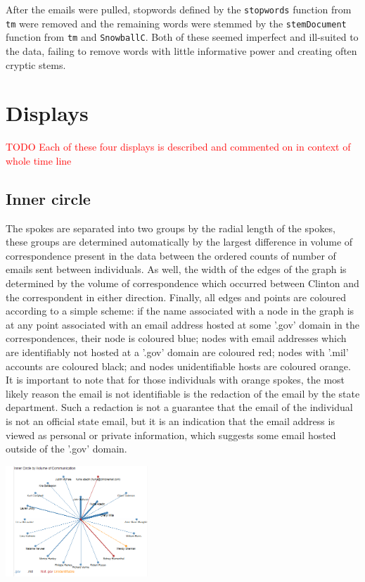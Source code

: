 \documentclass[journal]{vgtc}                %
\newcommand*{\TODO}[1]{\textcolor{red}{TODO #1}}
\begin{document}
After the emails were pulled, stopwords defined by the \texttt{stopwords} function from \texttt{tm} were removed and the remaining words were stemmed by the \texttt{stemDocument} function from \texttt{tm} and \texttt{SnowballC}. Both of these seemed imperfect and ill-suited to the data, failing to remove words with little informative power and creating often cryptic stems.

\section{Displays}
\TODO{Each of these four displays is described and commented on in context of whole time line}
\subsection{Inner circle} 
The spokes are separated into two groups by the radial length of the spokes, these groups are determined automatically by the largest difference in volume of correspondence present in the data between the ordered counts of number of emails sent between individuals. As well, the width of the edges of the graph is determined by the volume of correspondence which occurred between Clinton and the correspondent in either direction. Finally, all edges and points are coloured according to a simple scheme: if the name associated with a node in the graph is at any point associated with an email address hosted at some '.gov' domain in the correspondences, their node is coloured blue; nodes with email addresses which are identifiably not hosted at a '.gov' domain are coloured red; nodes with '.mil' accounts are coloured black; and nodes unidentifiable hosts are coloured orange. It is important to note that for those individuals with orange spokes, the most likely reason the email is not identifiable is the redaction of the email by the state department. Such a redaction is not a guarantee that the email of the individual is not an official state email, but it is an indication that the email address is viewed as personal or private information, which suggests some email hosted outside of the '.gov' domain.

\includegraphics[width=0.4\textwidth]{SpiralNetworkFullTime}
\end{document}
